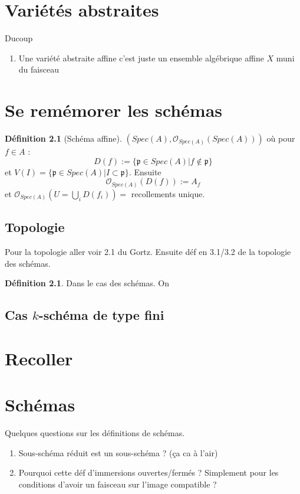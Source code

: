 \documentclass[a4paper,12pt]{book}
\newcommand{\Or}{\mathcal{O}}
\newcommand{\p}{\mathfrak{p}}
\theoremstyle{plain}
\theoremstyle{definition}
\newtheorem{defn}[subsection]{Définition}
\theoremstyle{remark}
\begin{document}
\chapter{Variétés abstraites}
Ducoup 
\begin{enumerate}
    \item Une variété abstraite affine c'est juste un ensemble algébrique
	affine $X$ muni du faisceau 
\end{enumerate}
\chapter{Se remémorer les schémas}
\begin{defn}[Schéma affine]
    $(Spec(A),\Or_{Spec(A)}(Spec(A)))$ où pour $f\in A$ :
    \[D(f):=\{\p\in Spec(A)|f\notin \p\}\]
    et $V(I)=\{\p\in Spec(A)| I\subset \p\}$. Ensuite 
    \[\Or_{Spec(A)}(D(f)):=A_f\]
    et $\Or_{Spec(A)}(U=\bigcup_i D(f_i))=$ recollements unique.
\end{defn}

\section{Topologie}
 Pour la topologie aller voir 2.1 du Gortz. Ensuite déf en 3.1/3.2
 de la topologie des schémas. 
\begin{defn}
    Dans le cas des schémas. On 
\end{defn}
\section{Cas $k$-schéma de type fini}

\chapter{Recoller}


\chapter{Schémas}
Quelques questions sur les définitions de schémas.
\begin{enumerate}
    \item Sous-schéma réduit est un sous-schéma ? (ça ca à l'air)
    \item Pourquoi cette déf d'immersions ouvertes/fermés ?
	Simplement pour les conditions d'avoir un faisceau
	sur l'image compatible ?
\end{enumerate}
\end{document}
